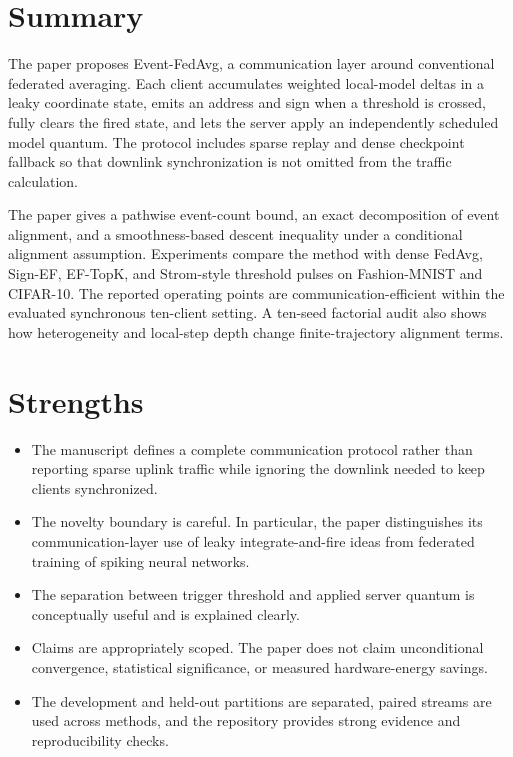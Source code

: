 \documentclass[10pt]{article}
\begin{document}
\section*{Summary}

The paper proposes Event-FedAvg, a communication layer around conventional
federated averaging. Each client accumulates weighted local-model deltas in a
leaky coordinate state, emits an address and sign when a threshold is crossed,
fully clears the fired state, and lets the server apply an independently
scheduled model quantum. The protocol includes sparse replay and dense
checkpoint fallback so that downlink synchronization is not omitted from the
traffic calculation.

The paper gives a pathwise event-count bound, an exact decomposition of event
alignment, and a smoothness-based descent inequality under a conditional
alignment assumption. Experiments compare the method with dense FedAvg,
Sign-EF, EF-TopK, and Strom-style threshold pulses on Fashion-MNIST and
CIFAR-10. The reported operating points are communication-efficient within
the evaluated synchronous ten-client setting. A ten-seed factorial audit also
shows how heterogeneity and local-step depth change finite-trajectory
alignment terms.

\section*{Strengths}

\begin{itemize}
  \item The manuscript defines a complete communication protocol rather than
  reporting sparse uplink traffic while ignoring the downlink needed to keep
  clients synchronized.
  \item The novelty boundary is careful. In particular, the paper distinguishes
  its communication-layer use of leaky integrate-and-fire ideas from federated
  training of spiking neural networks.
  \item The separation between trigger threshold and applied server quantum is
  conceptually useful and is explained clearly.
  \item Claims are appropriately scoped. The paper does not claim unconditional
  convergence, statistical significance, or measured hardware-energy savings.
  \item The development and held-out partitions are separated, paired streams
  are used across methods, and the repository provides strong evidence and
  reproducibility checks.
\end{itemize}
\end{document}
